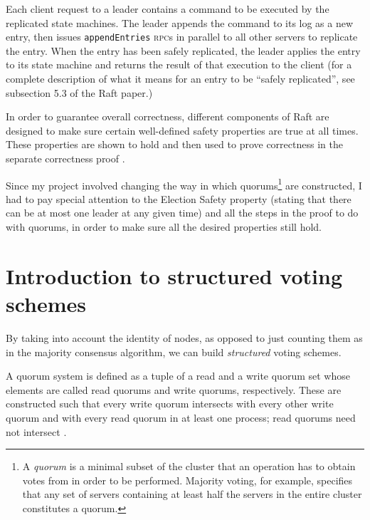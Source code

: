 \documentclass[11pt,chapterprefix=true,toc=bibliography,numbers=noendperiod,
               footnotes=multiple,twoside]{scrreprt}
\newcommand{\appendEntriesRPC}[0]{\texttt{appendEntries} \textsc{rpc}}
\begin{document}

Each client request to a leader contains a command to be executed by the replicated state machines. The leader appends the command to its log as a new entry, then issues \appendEntriesRPC s in parallel to all other servers to replicate the entry. When the entry has been safely replicated, the leader applies the entry to its state machine and returns the result of that execution to the client (for a complete description of what it means for an entry to be \enquote{safely replicated}, see subsection 5.3 of the Raft paper.)


In order to guarantee overall correctness, different components of Raft are designed to make sure certain well-defined safety properties are true at all times. These properties are shown to hold and then used to prove correctness in the separate correctness proof \autocite{raftproof}.

Since my project involved changing the way in which quorums\footnote{A \emph{quorum} is a minimal subset of the cluster that an operation has to obtain votes from in order to be performed. Majority voting, for example, specifies that any set of servers containing at least half the servers in the entire cluster constitutes a quorum.} are constructed, I had to pay special attention to the Election Safety property (stating that there can be at most one leader at any given time) and all the steps in the proof to do with quorums, in order to make sure all the desired properties still hold.

\section{Introduction to structured voting schemes\label{ssc:structured-voting-schemes}}

By taking into account the identity of nodes, as opposed to just counting them as in the majority consensus algorithm, we can build \emph{structured} voting schemes.


A quorum system is defined as a tuple of a read and a write quorum set whose elements are called read quorums and write quorums, respectively. These are constructed such that every write quorum intersects with every other write quorum and with every read quorum in at least one process; read quorums need not intersect \autocite{voting}.
\end{document}

